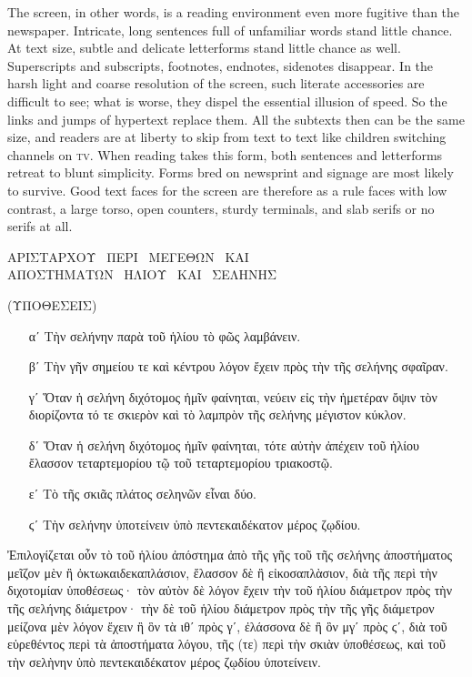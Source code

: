 \documentclass[a4paper,14pt]{memoir}
\begin{document}
The screen, in other words, is a reading environment even more fugitive than the newspaper. Intricate, long sentences full of unfamiliar words stand little chance. At text size, subtle and delicate letterforms stand little chance as well. Superscripts and subscripts, footnotes, endnotes, sidenotes disappear. In the harsh light and coarse resolution of the screen, such literate accessories are difficult to see; what is worse, they dispel the essential illusion of speed. So the links and jumps of hypertext replace them. All the subtexts then can be the same size, and readers are at liberty to skip from text to text like children switching channels on \textsc{tv}. When reading takes this form, both sentences and letterforms retreat to blunt simplicity. Forms bred on newsprint and signage are most likely to survive. Good text faces for the screen are therefore as a rule faces with low contrast, a large torso, open counters, sturdy terminals, and slab serifs or no serifs at all.

\newpage

\begin{center}
{%

{\large
ΑΡΙΣΤΑΡΧΟΥ~ ΠΕΡΙ~ ΜΕΓΕΘΩΝ~ ΚΑΙ\\
ΑΠΟΣΤΗΜΑΤΩΝ~ ΗΛΙΟΥ~ ΚΑΙ~ ΣΕΛΗΝΗΣ
}

(ΥΠΟΘΕΣΕΙΣ)
}
 
\end{center}

\tightlists
\begin{itemize}%
\item[αʹ]  Τὴν σελήνην παρὰ τοῦ ἡλίου τὸ φῶς λαμβάνειν.
\item[βʹ]  Τὴν γῆν σημείου τε καὶ κέντρου λόγον ἔχειν πρὸς τὴν τῆς σελήνης σφαῖραν.
\item[γʹ]  Ὅταν ἡ σελήνη διχότομος ἡμῖν φαίνηται, νεύειν εἰς τὴν ἡμετέραν ὄψιν τὸν διορίζοντα τό τε σκιερὸν καὶ τὸ λαμπρὸν τῆς σελήνης μέγιστον κύκλον.
\item[δʹ]  Ὅταν ἡ σελήνη διχότομος ἡμῖν φαίνηται, τότε αὐτὴν ἀπέχειν τοῦ ἡλίου ἔλασσον τεταρτεμορίου τῷ τοῦ τεταρτεμορίου τριακοστῷ.
\item[εʹ]  Τὸ τῆς σκιᾶς πλάτος σεληνῶν εἶναι δύο.
\item[ϛʹ]  Τὴν σελήνην ὑποτείνειν ὑπὸ πεντεκαιδέκατον μέρος ζῳδίου.
\end{itemize}
\medskip

Ἐπιλογίζεται οὖν τὸ τοῦ ἡλίου ἀπόστημα ἀπὸ τῆς γῆς τοῦ τῆς σελήνης ἀποστήματος μεῖζον μὲν ἢ ὀκτωκαιδεκαπλάσιον, ἔλασσον δὲ ἢ εἰκοσαπλὰσιον, διὰ τῆς περὶ τὴν διχοτομίαν ὑποθέσεως· τὸν αὐτὸν δὲ λόγον ἔχειν τὴν τοῦ ἡλίου διάμετρον πρὸς τὴν τῆς σελήνης διάμετρον· τὴν δὲ τοῦ ἡλίου διάμετρον πρὸς τὴν τῆς γῆς διάμετρον μείζονα μὲν λόγον ἔχειν ἢ ὃν τὰ ιθʹ πρὸς γʹ, ἐλάσσονα δὲ ἢ ὃν μγʹ πρὸς ϛʹ, διὰ τοῦ εὑρεθέντος περὶ τὰ ἀποστήματα λόγου, τῆς (τε) περὶ τὴν σκιὰν ὑποθέσεως, καὶ τοῦ τὴν σελὴνην ὑπὸ πεντεκαιδέκατον μέρος ζῳδίου ὑποτείνειν. 
\end{document}

